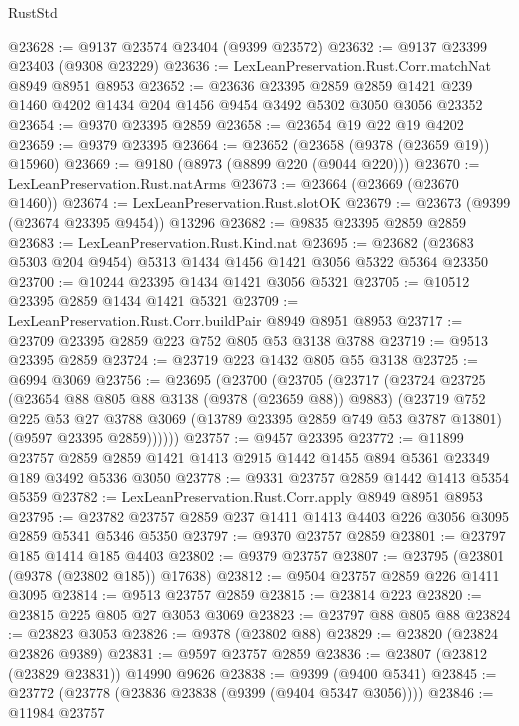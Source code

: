 \begin{lexlean}{RustStd}
\begin{coremodule}
@23628 := @9137 @23574 @23404 (@9399 @23572)
@23632 := @9137 @23399 @23403 (@9308 @23229)
@23636 := LexLeanPreservation.Rust.Corr.matchNat @8949 @8951 @8953
@23652 := @23636
    @23395
    @2859
    @2859
    @1421
    @239
    @1460
    @4202
    @1434
    @204
    @1456
    @9454
    @3492
    @5302
    @3050
    @3056
    @23352
@23654 := @9370 @23395 @2859
@23658 := @23654 @19 @22 @19 @4202
@23659 := @9379 @23395
@23664 := @23652 (@23658 (@9378 (@23659 @19)) @15960)
@23669 := @9180 (@8973 (@8899 @220 (@9044 @220)))
@23670 := LexLeanPreservation.Rust.natArms
@23673 := @23664 (@23669 (@23670 @1460))
@23674 := LexLeanPreservation.Rust.slotOK
@23679 := @23673 (@9399 (@23674 @23395 @9454)) @13296
@23682 := @9835 @23395 @2859 @2859
@23683 := LexLeanPreservation.Rust.Kind.nat
@23695 := @23682 (@23683 @5303 @204 @9454) @5313 @1434 @1456 @1421 @3056 @5322 @5364 @23350
@23700 := @10244 @23395 @1434 @1421 @3056 @5321
@23705 := @10512 @23395 @2859 @1434 @1421 @5321
@23709 := LexLeanPreservation.Rust.Corr.buildPair @8949 @8951 @8953
@23717 := @23709 @23395 @2859 @223 @752 @805 @53 @3138 @3788
@23719 := @9513 @23395 @2859
@23724 := @23719 @223 @1432 @805 @55 @3138
@23725 := @6994 @3069
@23756 := @23695
    (@23700
      (@23705
        (@23717
          (@23724
            @23725
            (@23654 @88 @805 @88 @3138 (@9378 (@23659 @88)) @9883)
            (@23719
              @752
              @225
              @53
              @27
              @3788
              @3069
              (@13789 @23395 @2859 @749 @53 @3787 @13801)
              (@9597 @23395 @2859))))))
@23757 := @9457 @23395
@23772 := @11899
    @23757
    @2859
    @2859
    @1421
    @1413
    @2915
    @1442
    @1455
    @894
    @5361
    @23349
    @189
    @3492
    @5336
    @3050
@23778 := @9331 @23757 @2859 @1442 @1413 @5354 @5359
@23782 := LexLeanPreservation.Rust.Corr.apply @8949 @8951 @8953
@23795 := @23782 @23757 @2859 @237 @1411 @1413 @4403 @226 @3056 @3095 @2859 @5341 @5346 @5350
@23797 := @9370 @23757 @2859
@23801 := @23797 @185 @1414 @185 @4403
@23802 := @9379 @23757
@23807 := @23795 (@23801 (@9378 (@23802 @185)) @17638)
@23812 := @9504 @23757 @2859 @226 @1411 @3095
@23814 := @9513 @23757 @2859
@23815 := @23814 @223
@23820 := @23815 @225 @805 @27 @3053 @3069
@23823 := @23797 @88 @805 @88
@23824 := @23823 @3053
@23826 := @9378 (@23802 @88)
@23829 := @23820 (@23824 @23826 @9389)
@23831 := @9597 @23757 @2859
@23836 := @23807 (@23812 (@23829 @23831)) @14990 @9626
@23838 := @9399 (@9400 @5341)
@23845 := @23772 (@23778 (@23836 @23838 (@9399 (@9404 @5347 @3056))))
@23846 := @11984 @23757

\end{coremodule}
\end{lexlean}
